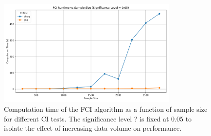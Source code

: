 \begin{figure}[htbp]
    \centering
    \includegraphics[width=0.8\textwidth]{Report/final_report/pictures/fci_runtime_vs_samplesize.png}
    \caption{Computation time of the FCI algorithm as a function of sample size for different CI tests. The significance level ? is fixed at 0.05 to isolate the effect of increasing data volume on performance.}
    \label{fig:fci_runtime_vs_samplesize}
\end{figure}

